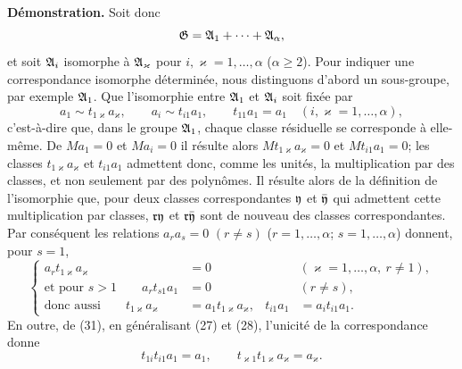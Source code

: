 \textbf{Démonstration.} Soit donc
\[
  \mathfrak{G}=\mathfrak{A}_1+\cdots+\mathfrak{A}_\alpha,
\]
et soit $\mathfrak{A}_i$ isomorphe à $\mathfrak{A}_\varkappa$ pour $i,\varkappa=1,\ldots,\alpha$ ($\alpha\ge2$). Pour indiquer une correspondance isomorphe déterminée, nous distinguons d'abord un sous-groupe, par exemple $\mathfrak{A}_1$. Que l'isomorphie entre $\mathfrak{A}_1$ et $\mathfrak{A}_i$ soit fixée par
\begin{equation}
 a_1\sim t_{1\varkappa}a_\varkappa,
 \qquad
 a_i\sim t_{i1}a_1,
 \qquad
 t_{11}a_1=a_1
 \quad(i,\varkappa=1,\ldots,\alpha),
\tag{31}
\end{equation}
c'est-à-dire que, dans le groupe $\mathfrak{A}_1$, chaque classe résiduelle se corresponde à elle-même. De $Ma_1=0$ et $Ma_i=0$ il résulte alors $Mt_{1\varkappa}a_\varkappa=0$ et $Mt_{i1}a_1=0$; les classes $t_{1\varkappa}a_\varkappa$ et $t_{i1}a_1$ admettent donc, comme les unités, la multiplication par des classes, et non seulement par des polynômes. Il résulte alors de la définition de l'isomorphie que, pour deux classes correspondantes $\mathfrak{y}$ et $\bar{\mathfrak{y}}$ qui admettent cette multiplication par classes, $\mathfrak r\mathfrak{y}$ et $\mathfrak r\bar{\mathfrak{y}}$ sont de nouveau des classes correspondantes. Par conséquent les relations $a_ra_s=0$ $(r\ne s)$ ($r=1,\ldots,\alpha$; $s=1,\ldots,\alpha$) donnent, pour $s=1$,
\begin{equation}
\left\{
\begin{aligned}
 a_r t_{1\varkappa}a_\varkappa&=0 &&(\varkappa=1,\ldots,\alpha,\ r\ne1),\\
 \text{et pour }s>1\qquad a_r t_{s1}a_1&=0 &&(r\ne s),\\
 \text{donc aussi}\qquad t_{1\varkappa}a_\varkappa&=a_1t_{1\varkappa}a_\varkappa,
 &t_{i1}a_1&=a_it_{i1}a_1.
\end{aligned}\right.
\tag{32}
\end{equation}
En outre, de (31), en généralisant (27) et (28), l'unicité de la correspondance donne
\begin{equation}
 t_{1i}t_{i1}a_1=a_1,
 \qquad
 t_{\varkappa1}t_{1\varkappa}a_\varkappa=a_\varkappa.
\tag{33}
\end{equation}

